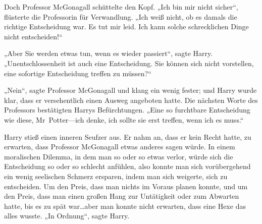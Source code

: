 Doch Professor McGonagall schüttelte den Kopf. „Ich bin mir nicht sicher“, flüsterte die Professorin für Verwandlung. „Ich weiß nicht, ob es damals die richtige Entscheidung war. Es tut mir leid. Ich kann solche schrecklichen Dinge nicht entscheiden!“

„Aber Sie werden etwas tun, wenn es wieder passiert“, sagte Harry. „Unentschlossenheit ist auch eine Entscheidung. Sie können sich nicht vorstellen, eine sofortige Entscheidung treffen zu müssen?“

„Nein“, sagte Professor McGonagall und klang ein wenig fester; und Harry wurde klar, dass er versehentlich einen Ausweg angeboten hatte. Die nächsten Worte des Professors bestätigten Harrys Befürchtungen. „Eine so furchtbare Entscheidung wie diese, Mr~Potter—ich denke, ich sollte sie erst treffen, wenn ich es muss.“

Harry stieß einen inneren Seufzer aus. Er nahm an, dass er kein Recht hatte, zu erwarten, dass Professor McGonagall etwas anderes sagen würde. In einem moralischen Dilemma, in dem man so oder so etwas verlor, würde sich die Entscheidung so oder so schlecht anfühlen, also konnte man sich vorübergehend ein wenig seelischen Schmerz ersparen, indem man sich weigerte, sich zu entscheiden. Um den Preis, dass man nichts im Voraus planen konnte, und um den Preis, dass man einen großen Hang zur Untätigkeit oder zum Abwarten hatte, bis es zu spät war…aber man konnte nicht erwarten, dass eine Hexe das alles wusste.
„In Ordnung“, sagte Harry.

